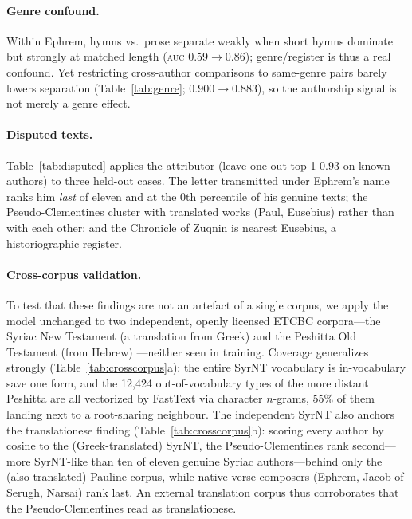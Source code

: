 \documentclass[11pt]{article}
\newcommand{\auc}{\textsc{auc}}
\newcommand{\auc}{\textsc{auc}}
\begin{document}


\paragraph{Genre confound.}
Within Ephrem, hymns vs.\ prose separate weakly when short hymns dominate but
strongly at matched length (\auc{} $0.59\to0.86$); genre/register is thus a
real confound. Yet restricting cross-author comparisons to same-genre pairs
barely lowers separation (Table~\ref{tab:genre}; $0.900\to0.883$), so the
authorship signal is not merely a genre effect.



\paragraph{Disputed texts.}
Table~\ref{tab:disputed} applies the attributor (leave-one-out top-1 $0.93$ on
known authors) to three held-out cases. The letter transmitted under Ephrem's
name ranks him \emph{last} of eleven and at the 0th percentile of his genuine
texts; the Pseudo-Clementines cluster with translated works (Paul, Eusebius)
rather than with each other; and the Chronicle of Zuqnin is nearest Eusebius, a
historiographic register.



\paragraph{Cross-corpus validation.}
To test that these findings are not an artefact of a single corpus, we apply the
model unchanged to two independent, openly licensed ETCBC corpora---the Syriac
New Testament (a translation from Greek) and the Peshitta Old Testament (from
Hebrew) \citep{etcbcsyriac}---neither seen in training. Coverage generalizes
strongly (Table~\ref{tab:crosscorpus}a): the entire SyrNT vocabulary is
in-vocabulary save one form, and the 12{,}424 out-of-vocabulary types of the more
distant Peshitta are all vectorized by FastText via character $n$-grams, 55\% of
them landing next to a root-sharing neighbour. The independent SyrNT also anchors
the translationese finding (Table~\ref{tab:crosscorpus}b): scoring every author by
cosine to the (Greek-translated) SyrNT, the Pseudo-Clementines rank second---more
SyrNT-like than ten of eleven genuine Syriac authors---behind only the (also
translated) Pauline corpus, while native verse composers (Ephrem, Jacob of
Serugh, Narsai) rank last. An external translation corpus thus corroborates that
the Pseudo-Clementines read as translationese.
\end{document}
